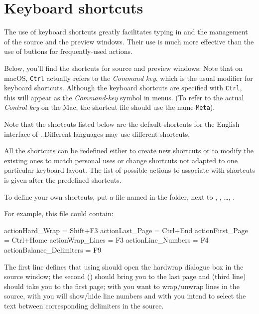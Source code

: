 \section{Keyboard shortcuts}
\label{sec.shortcuts}

The use of keyboard shortcuts greatly facilitates typing in and the management of the source and the preview windows. Their use is much more effective than the use of buttons for frequently-used actions.

Below, you'll find the shortcuts for source and preview windows. Note that on macOS, \verb|Ctrl| actually refers to the \emph{Command key}, which is the usual modifier for keyboard shortcuts. Although the keyboard shortcuts are specified with \verb|Ctrl|, this will appear as the \emph{Command-key} symbol in menus. (To refer to the actual \emph{Control key} on the Mac, the shortcut file should use the name \verb|Meta|).

Note that the shortcuts listed below are the default shortcuts for the English interface of {\Tw}. Different languages may use different shortcuts.

All the shortcuts can be redefined either to create new shortcuts or to modify the existing ones to match personal uses or change shortcuts not adapted to one particular keyboard layout. The list of possible actions to associate with shortcuts is given after the predefined shortcuts.

To define your own shortcuts, put a file named  in the  folder, next to , , \dots, .

For example, this  file could contain:
\begin{verbExample}
actionHard_Wrap = Shift+F3
actionLast_Page = Ctrl+End
actionFirst_Page = Ctrl+Home
actionWrap_Lines = F3
actionLine_Numbers = F4
actionBalance_Delimiters = F9
\end{verbExample}

The first line defines that using  should open the hardwrap dialogue box in the source window; the second () should bring you to the last page and  (third line) should take you to the first page; with  you want to wrap/unwrap lines in the source, with  you will show/hide line numbers and with  you intend to select the text between corresponding delimiters in the source.

